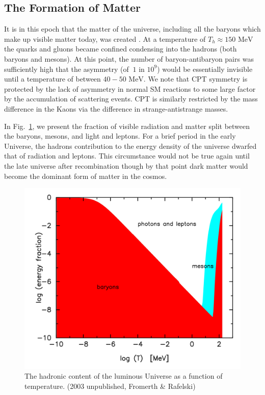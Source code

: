 \documentclass[universe,article,submit,moreauthors,pdftex,a4paper]{Definitions/mdpi}
\newcommand{\MeV}{\text{ MeV}}
\newcommand*{\rf}[1]{Fig.~{\ref{#1}}}
\begin{document}
\subsection{The Formation of Matter}\label{sec:Creation}
\noindent It is in this epoch that the matter of the universe, including all the baryons which make up visible matter today, was created \cite{Rafelski:2019twp}. At a temperature of $T_{h}\approx150\MeV$ the quarks and gluons became confined condensing into the hadrons (both baryons and mesons). At this point, the number of baryon-antibaryon pairs was sufficiently high that the asymmetry (of $~1$ in $10^{9}$) would be essentially invisible until a temperature of between $40-50\MeV$. We note that CPT symmetry is protected by the lack of asymmetry in normal SM reactions to some large factor by the accumulation of scattering events. CPT is similarly restricted by the mass difference in the Kaons via the difference in strange-antistrange masses.

In \rf{hadron_content}, we present the fraction of visible radiation and matter split between the baryons, mesons, and light and leptons. For a brief period in the early Universe, the hadrons contribution to the energy density of the universe dwarfed that of radiation and leptons. This circumstance would not be true again until the late universe after recombination though by that point dark matter would become the dominant form of matter in the cosmos.

\begin{figure}[H]
\centering
\includegraphics[width=\linewidth]{hadron_content.png}
\caption{The hadronic content of the luminous Universe as a function of temperature. (2003 unpublished, Fromerth \& Rafelski) \cite{Rafelski:2019twp}}
\label{hadron_content}
\end{figure}
\end{document}
